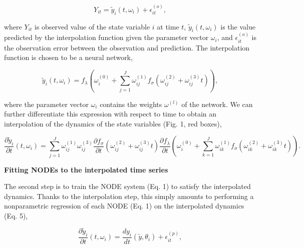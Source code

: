 \documentclass[11pt, oneside]{article}
\begin{document}
\vspace{-0.5cm}
\begin{equation}
    Y_{it} = \tilde{y}_i(t,\omega_i) + \epsilon^{(o)}_{it},
\end{equation}

where $Y_{it}$ is observed value of the state variable $i$ at time $t$, $\tilde{y}_i(t,\omega_i)$ is the value predicted by the interpolation function given the parameter vector $\omega_i$, and $\epsilon^{(o)}_{it}$ is the observation error between the observation and prediction. 
The interpolation function is chosen to be a neural network,

\vspace{-0.5cm}
\begin{equation}
    \tilde{y}_i (t,\omega_i) = f_\lambda \left( \omega_i^{(0)} + \sum_{j=1}^{J} \omega^{(1)}_{ij} f_\sigma \left( \omega^{(2)}_{ij} + \omega^{(3)}_{ij} t \right) \right),
\end{equation}

where the parameter vector $\omega_i$ contains the weights $\omega^{(l)}$ of the network.
We can further differentiate this expression with respect to time to obtain an interpolation of the dynamics of the state variables (Fig. 1, red boxes), 

\vspace{-0.5cm}
\begin{equation}
    \frac{\partial \tilde{y}_i}{\partial t} (t, \omega_i) = \sum_{j=1}^{J} \omega^{(1)}_{ij} \omega^{(3)}_{ij} \frac{\partial f_\sigma}{\partial t} \left(\omega^{(2)}_{ij} + \omega^{(3)}_{ij} t \right) \frac{\partial f_\lambda}{\partial t} \left ( \omega^{(0)}_{i} + \sum_{k=1}^{J} \omega^{(1)}_{ik} f_\sigma \left( \omega^{(2)}_{ik} + \omega^{(3)}_{ik} t \right) \right ). 
\end{equation}

\textbf{Fitting NODEs to the interpolated time series}

The second step is to train the NODE system (Eq. 1) to satisfy the interpolated dynamics.
Thanks to the interpolation step, this simply amounts to performing a nonparametric regression of each NODE (Eq. 1) on the interpolated dynamics (Eq. 5),

\vspace{-0.5cm}
\begin{equation}
    \frac{\partial \tilde{y}_i}{\partial t} (t, \omega_i) = \frac{dy_i}{dt} \left( \tilde{y},\theta_i \right) + \epsilon^{(p)}_{it},
\end{equation}
\end{document}

